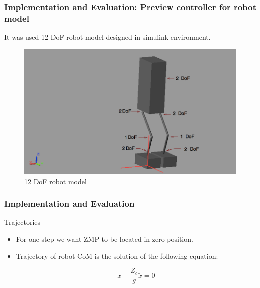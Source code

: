\documentclass{beamer}
\begin{document}

	\begin{frame}
		\frametitle{Implementation and Evaluation: Preview controller for robot model}
		It was used 12 DoF robot model designed in simulink environment.
		
		\begin{figure}[h!]
			\centering
			\includegraphics[width=0.8\linewidth]{presentation_images/25}
			\caption{12 DoF robot model}
		\end{figure}
	\end{frame}
	

	\begin{frame}
		\frametitle{Implementation and Evaluation}
		\begin{block}{Trajectories}
			\begin{itemize}
				\item
					For one step we want ZMP to be located in zero position.
				\item
					Trajectory of robot CoM is the solution of the following equation:
					
					\begin{equation}
						x - \dfrac{Z_c}{g} \ddot{x} = 0
					\end{equation}
			\end{itemize}
		\end{block}
	\end{frame}
	
\end{document}
